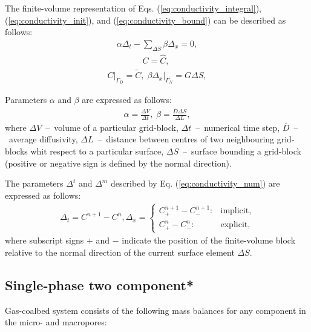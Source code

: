\documentclass[a4paper,14pt,english]{extreport}
\begin{document}
The finite-volume representation of Eqs. (\ref{eq:conductivity_integral}), (\ref{eq:conductivity_init}), and (\ref{eq:conductivity_bound}) can be described as follows:
    \begin{eqnarray}
        \label{eq:conductivity_num}
        \alpha \Delta_{t} - \sum_{\Delta S} \beta\Delta_{x}= 0,
    \end{eqnarray}
    \begin{eqnarray}
         \label{eq:eq:conductivity_init_num}
        C = \hat{C}, \; 
    \end{eqnarray}
    \begin{eqnarray}
    \label{eq:eq:conductivity_bound_num}
      \label{eq:conductivity_bound_num}
    C \Big|_{\mathit{\Gamma}_D}= \tilde{C}, \; \beta\Delta_x \Big|_{\mathit{\Gamma}_N} = G\Delta S,
    \end{eqnarray}

Parameters $\alpha$ and $\beta$ are expressed as follows:
    \begin{eqnarray}
        \label{eq:alpha_beta}
        \alpha = \frac{\Delta V}{\Delta t}, \;
        \beta= \frac{\overline{D} \Delta S}{\Delta L},
    \end{eqnarray}
where $\Delta V$~--~volume of a particular grid-block, $\Delta t$~--~numerical time step, $\overline{D}$~--~average diffusivity, $\Delta L$~--~distance between centres of two neighbouring grid-blocks whit respect to a particular surface, $\Delta S$~--~surface bounding a grid-block (positive or negative sign is defined by the normal direction).

The parameters $\Delta^{t}$ and $\Delta^{m}$ described by Eq. (\ref{eq:conductivity_num}) are expressed as follows:
    \begin{eqnarray}
    \label{eq:delta_num}
    \Delta_t = C^{n+1} - C^{n}, \Delta_x = \begin{cases}
    C_{+}^{n+\mathit1} - C_{-}^{n+\mathit1} : &\text{implicit},\\
        C_{+}^{n} - C_{-}^{n} : &\text{explicit},
    \end{cases}
    \end{eqnarray}
where subscript signs $+$ and $-$ indicate the position of the finite-volume block relative to the normal direction of the current surface element $\Delta S$.

 \subsection*{Single-phase two component*}
Gas-coalbed system consists of the following mass balances for any component in the micro- and macropores:
\end{document}
